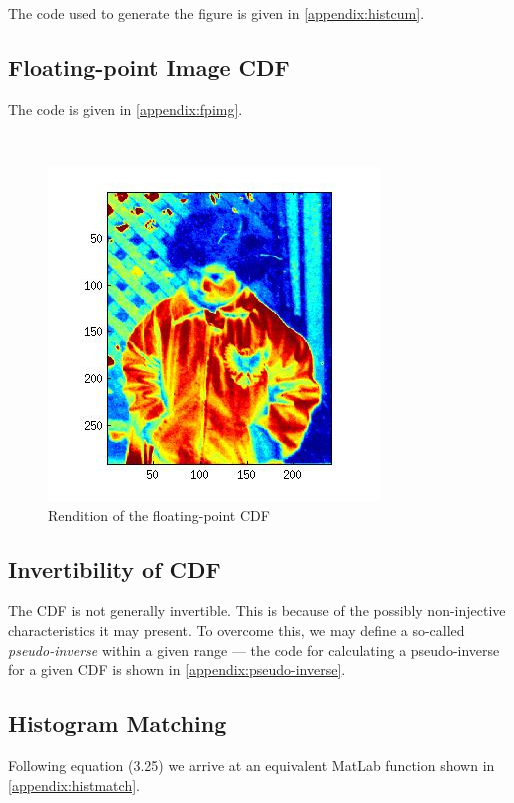 The code used to generate the figure is given in \ref{appendix:histcum}.

\subsection{Floating-point Image CDF}
\begin{multicols}{2}

    The code is given in \ref{appendix:fpimg}.
    
    \vfill{\ }\columnbreak
    
    \begin{figure}[H]
        \includegraphics[scale=0.5]{figures/1-4.jpg}
        \caption{Rendition of the floating-point CDF}
        \label{fig:1-4}
    \end{figure}

\end{multicols}

\subsection{Invertibility of CDF}
The CDF is not generally invertible. This is because of the possibly
non-injective characteristics it may present. To overcome this, we may define
a so-called {\it pseudo-inverse} within a given range --- the code for
calculating a pseudo-inverse for a given CDF is shown in
\ref{appendix:pseudo-inverse}.

\subsection{Histogram Matching}
Following equation (3.25) \cite[pp. 74]{SB} we arrive at an equivalent MatLab
function shown in \ref{appendix:histmatch}.

